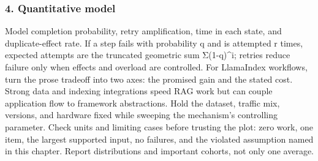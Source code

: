 \subsubsection*{4. Quantitative model}
Model completion probability, retry amplification, time in each state, and duplicate-effect rate. If a step fails with probability q and is attempted r times, expected attempts are the truncated geometric sum Σ(1-q)\textasciicircum{}i; retries reduce failure only when effects and overload are controlled.
For LlamaIndex workflows, turn the prose tradeoff into two axes: the promised gain and the stated cost. Strong data and indexing integrations speed RAG work but can couple application flow to framework abstractions. Hold the dataset, traffic mix, versions, and hardware fixed while sweeping the mechanism's controlling parameter.
Check units and limiting cases before trusting the plot: zero work, one item, the largest supported input, no failures, and the violated assumption named in this chapter. Report distributions and important cohorts, not only one average.
